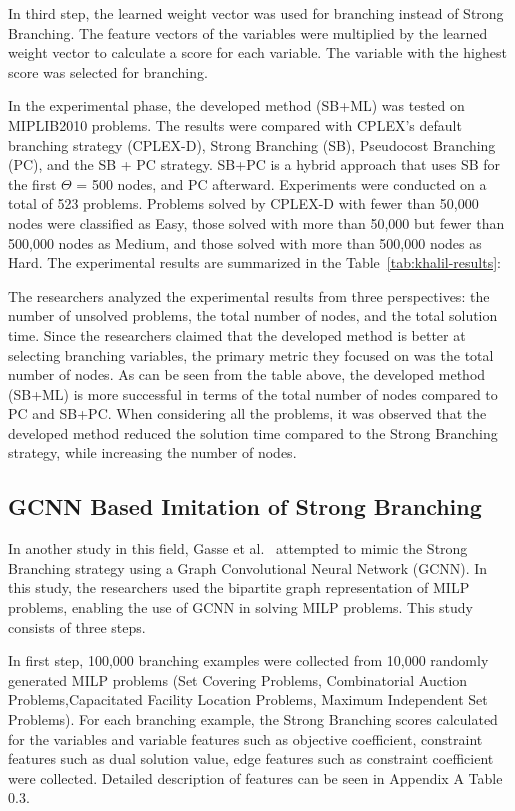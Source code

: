 In third step, the learned weight vector was used for branching instead of Strong Branching.
The feature vectors of the variables were multiplied by the learned weight vector to calculate a score for each variable.
The variable with the highest score was selected for branching.


In the experimental phase, the developed method (SB+ML) was tested on MIPLIB2010 problems.
The results were compared with CPLEX's default branching strategy (CPLEX-D), Strong Branching (SB), Pseudocost Branching (PC), and the SB + PC strategy. SB+PC is a hybrid approach that uses SB for the first $\Theta$ = 500 nodes, and PC afterward.
Experiments were conducted on a total of 523 problems.
Problems solved by CPLEX-D with fewer than 50,000 nodes were classified as Easy, those solved with more than 50,000 but fewer than 500,000 nodes as Medium, and those solved with more than 500,000 nodes as Hard.
The experimental results are summarized in the Table~\ref{tab:khalil-results}:




The researchers analyzed the experimental results from three perspectives: the number of unsolved problems, the total number of nodes, and the total solution time.
Since the researchers claimed that the developed method is better at selecting branching variables, the primary metric they focused on was the total number of nodes.
As can be seen from the table above, the developed method (SB+ML) is more successful in terms of the total number of nodes compared to PC and SB+PC.
When considering all the problems, it was observed that the developed method reduced the solution time compared to the Strong Branching strategy, while increasing the number of nodes.


\subsection{GCNN Based Imitation of Strong Branching}\label{subsec:gcnn-based-imitation-of-strong-branching}
In another study in this field, Gasse et al.~\cite{gasseExactCombinatorialOptimization2019} attempted to mimic the Strong Branching strategy using a Graph Convolutional Neural Network (GCNN).
In this study, the researchers used the bipartite graph representation of MILP problems, enabling the use of GCNN in solving MILP problems.
This study consists of three steps.


In first step, 100,000 branching examples were collected from 10,000 randomly generated MILP problems (Set Covering Problems, Combinatorial Auction Problems,Capacitated Facility Location Problems, Maximum Independent Set Problems).
For each branching example, the Strong Branching scores calculated for the variables and variable features such as objective coefficient, constraint features such as dual solution value, edge features such as constraint coefficient were collected.
Detailed description of features can be seen in Appendix A Table 0.3. %


